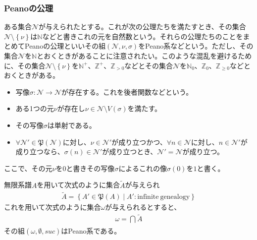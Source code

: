 \documentclass[dvipdfmx]{jsarticle}
\begin{document}
\subsubsection{Peanoの公理}%
\begin{axs}[Peanoの公理]
ある集合$\mathcal{N}$が与えられたとする。これが次の公理たちを満たすとき、その集合$\mathcal{N \setminus}\left\{ \nu \right\}$は$\mathbb{N}$などと書きこれの元を自然数という。それらの公理たちのことをまとめてPeanoの公理といいその組$\left( \mathcal{N,}\nu,\sigma \right)$をPeano系などという。ただし、その集合$\mathcal{N}$を$\mathbb{N}$とおくときがあることに注意されたい。このような混乱を避けるために、その集合$\mathcal{N \setminus}\left\{ \nu \right\}$を$\mathbb{N}^{+}$、$\mathbb{Z}^{+}$、$\mathbb{Z}_{> 0}$などとその集合$\mathcal{N}$を$\mathbb{N}_{0}$、$\mathbb{Z}_{0}$、$\mathbb{Z}_{\geq 0}$などとおくときがある。
\begin{itemize}
\item
  写像$\sigma:\mathcal{N \rightarrow N}$が存在する。これを後者関数などという。
\item
  ある1つの元$\nu$が存在し$\nu\in \mathcal{N \setminus}V(\sigma)$を満たす。
\item
  その写像$\sigma$は単射である。
\item
  $\forall\mathcal{N}'\in \mathfrak{P}\left( \mathcal{N} \right)$に対し、$\nu \in \mathcal{N}'$が成り立つかつ、$\forall n \in \mathcal{N}$に対し、$n \in \mathcal{N}'$が成り立つなら、$\sigma(n) \in \mathcal{N}'$が成り立つとき、$\mathcal{N}' = \mathcal{N}$が成り立つ。
\end{itemize}
ここで、その元$\nu$を$0$と書きその写像$\sigma$によるこれの像$\sigma(0)$を$1$と書く。
\end{axs}
\begin{thm}\label{1.2.4.5}
無限系譜$A$を用いて次式のように集合$\widetilde{A}$が与えられ
\begin{align*}
\widetilde{A} = \left\{ A'\in \mathfrak{P}(A) \middle| A':\mathrm{infinite\ genealogy} \right\}
\end{align*}
これを用いて次式のように集合$\omega$が与えられるとすると、
\begin{align*}
\omega = \bigcap_{} \widetilde{A}
\end{align*}
その組$(\omega,\emptyset,suc)$はPeano系である。
\end{thm}
\end{document}
